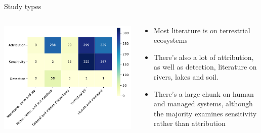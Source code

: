 \documentclass[9pt]{beamer}
\begin{document}
\begin{frame}{Study types}

\begin{columns}
	\begin{column}{0.618\linewidth}
		\includegraphics[width=\linewidth]{../plots/literature_distribution/heatmap_study_types_africa.pdf}
	\end{column}
	\begin{column}{0.382\linewidth}
		\begin{itemize}
			\item Most literature is on terrestrial ecosystems
			\item There's also a lot of attribution, as well as detection, literature on rivers, lakes and soil.
			\item There's a large chunk on human and managed systems, although the majority examines sensitivity rather than attribution
		\end{itemize}
	\end{column}
\end{columns}

\end{frame}
\end{document}
